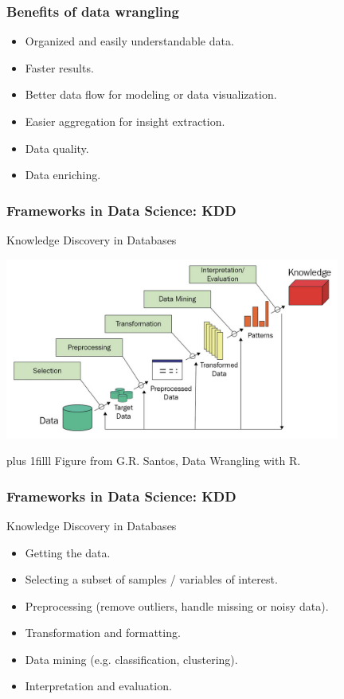 \documentclass{beamer}
\newcommand{\btVFill}{\vskip0pt plus 1filll}
\begin{document}
	\begin{frame}
		\frametitle{Benefits of data wrangling}

		\begin{itemize}
			\item Organized and easily understandable data.
			\item Faster results.
			\item Better data flow for modeling or data visualization.
			\item Easier aggregation for insight extraction.
			\item Data quality.
			\item Data enriching.
		\end{itemize}

	\end{frame}

	\begin{frame}
		\frametitle{Frameworks in Data Science: KDD}

		Knowledge Discovery in Databases

		\includegraphics[width=11cm]{figures/Santos_1_6.png}

		\btVFill
		\tiny{Figure from G.R. Santos, Data Wrangling with R.}

	\end{frame}

	\begin{frame}
		\frametitle{Frameworks in Data Science: KDD}

		Knowledge Discovery in Databases

		\vspace{2em}

		\begin{itemize}
			\item Getting the data.
			\item Selecting a subset of samples / variables of interest.
			\item Preprocessing (remove outliers, handle missing or noisy data).
			\item Transformation and formatting.
			\item Data mining (e.g. classification, clustering).
			\item Interpretation and evaluation.
		\end{itemize}

	\end{frame}
\end{document}
